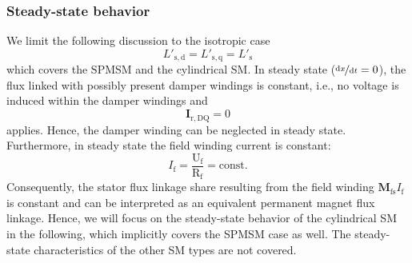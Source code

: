 \begin{frame}
	\frametitle{Steady-state behavior}
	We limit the following discussion to the isotropic case
	$$L'_\mathrm{s,d} =  L'_\mathrm{s,q} =L'_\mathrm{s}$$
	which covers the SPMSM and the cylindrical SM. \pause In steady state ($\nicefrac{\mathrm{d}x}{\mathrm{d}t} = 0$), the flux linked with possibly present damper windings is constant, i.e., no voltage is induced within the damper windings and 
	$$\bm{I}_\mathrm{r,DQ} = 0$$ 
	applies. \pause Hence, the damper winding can be neglected in steady state. \pause Furthermore, in steady state the field winding current is constant: 
	$$I_\mathrm{f} = \frac{\mathrm{U}_\mathrm{f} }{\mathrm{R}_\mathrm{f}} = \mathrm{const.}$$
	\pause
	Consequently, the stator flux linkage share resulting from the field winding $\bm{M}_\mathrm{fs} I_{\mathrm{f}}$ is constant and can be interpreted as an equivalent permanent magnet flux linkage. Hence, we will focus on the steady-state behavior of the cylindrical SM in the following, which implicitly covers the SPMSM case as well. The steady-state characteristics of the other SM types are not covered.
\end{frame}

